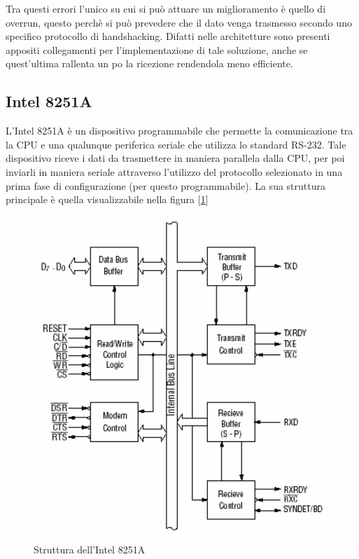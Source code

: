 Tra questi errori l'unico su cui si può attuare un miglioramento è quello di overrun, questo perchè si può prevedere che il dato venga trasmesso secondo uno specifico protocollo di handshacking. Difatti nelle architetture sono presenti appositi collegamenti per l'implementazione di tale soluzione, anche se quest'ultima rallenta un po la ricezione rendendola meno efficiente.

\subsection{Intel 8251A}\label{par:intel-8251A}
L'Intel 8251A è un dispositivo programmabile che permette la comunicazione tra la CPU e una qualunque periferica seriale che utilizza lo standard RS-232. Tale dispositivo riceve i dati da trasmettere in maniera parallela dalla CPU, per poi inviarli in maniera seriale attraverso l'utilizzo del protocollo selezionato in una prima fase di configurazione (per questo programmabile). 
La sua struttura principale è quella visualizzabile nella figura [\ref{img:Intel-8251A}]

\begin{figure}[ht]
    \centering
    \includegraphics[width=.5\textwidth]{img/Intel8251A.png}
    \caption{Struttura dell'Intel 8251A}\label{img:Intel-8251A}
\end{figure}

